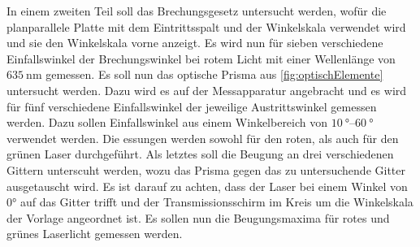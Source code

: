 \noindent
In einem zweiten Teil soll das Brechungsgesetz untersucht werden, wofür die planparallele Platte mit dem Eintrittsspalt und der Winkelskala verwendet wird und sie den Winkelskala
vorne anzeigt. Es wird nun für sieben verschiedene Einfallswinkel der Brechungswinkel bei rotem Licht mit einer Wellenlänge von $\SI{635}{\nano\metre}$ gemessen. \newline
Es soll nun das optische Prisma aus \autoref{fig:optischElemente} untersucht werden. Dazu wird es auf der Messapparatur angebracht und es wird für fünf verschiedene Einfallswinkel der
jeweilige Austrittswinkel gemessen werden. Dazu sollen Einfallswinkel aus einem Winkelbereich von $\SIrange{10}{60}{\degree}$ verwendet werden. Die essungen werden sowohl für den roten,
als auch für den grünen Laser durchgeführt.\newline
Als letztes soll die Beugung an drei verschiedenen Gittern unterscuht werden, wozu das Prisma gegen das zu untersuchende Gitter ausgetauscht wird. Es ist darauf zu achten, dass der Laser bei einem Winkel von $0°$ auf das
Gitter trifft und der Transmissionsschirm im Kreis um die Winkelskala der Vorlage angeordnet ist. Es sollen nun die Beugungsmaxima für rotes und grünes Laserlicht gemessen werden.